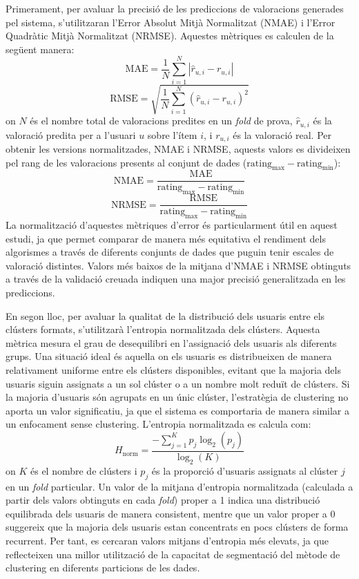 \documentclass[a4paper,12pt]{report}
\begin{document}
Primerament, per avaluar la precisió de les prediccions de valoracions generades pel sistema, s'utilitzaran l'Error Absolut Mitjà Normalitzat (NMAE) i l'Error Quadràtic Mitjà Normalitzat (NRMSE). Aquestes mètriques es calculen de la següent manera:
\[
\text{MAE} = \frac{1}{N} \sum_{i=1}^{N} | \hat{r}_{u,i} - r_{u,i} |
\]
\[
\text{RMSE} = \sqrt{\frac{1}{N} \sum_{i=1}^{N} (\hat{r}_{u,i} - r_{u,i})^2}
\]
on \(N\) és el nombre total de valoracions predites en un \textit{fold} de prova, \( \hat{r}_{u,i} \) és la valoració predita per a l'usuari \(u\) sobre l'ítem \(i\), i \( r_{u,i} \) és la valoració real.
Per obtenir les versions normalitzades, NMAE i NRMSE, aquests valors es divideixen pel rang de les valoracions presents al conjunt de dades (\( \text{rating}_{\text{max}} - \text{rating}_{\text{min}} \)):
\[
\text{NMAE} = \frac{\text{MAE}}{\text{rating}_{\text{max}} - \text{rating}_{\text{min}}}
\]
\[
\text{NRMSE} = \frac{\text{RMSE}}{\text{rating}_{\text{max}} - \text{rating}_{\text{min}}}
\]
La normalització d'aquestes mètriques d'error és particularment útil en aquest estudi, ja que permet comparar de manera més equitativa el rendiment dels algorismes a través de diferents conjunts de dades que puguin tenir escales de valoració distintes. Valors més baixos de la mitjana d'NMAE i NRMSE obtinguts a través de la validació creuada indiquen una major precisió generalitzada en les prediccions.

En segon lloc, per avaluar la qualitat de la distribució dels usuaris entre els clústers formats, s'utilitzarà l'entropia normalitzada dels clústers. Aquesta mètrica mesura el grau de desequilibri en l'assignació dels usuaris als diferents grups. Una situació ideal és aquella on els usuaris es distribueixen de manera relativament uniforme entre els clústers disponibles, evitant que la majoria dels usuaris siguin assignats a un sol clúster o a un nombre molt reduït de clústers. Si la majoria d'usuaris són agrupats en un únic clúster, l'estratègia de clustering no aporta un valor significatiu, ja que el sistema es comportaria de manera similar a un enfocament sense clustering. L'entropia normalitzada es calcula com:
\[
H_{\text{norm}} = \frac{-\sum_{j=1}^{K} p_j \log_2(p_j)}{\log_2(K)}
\]
on \(K\) és el nombre de clústers i \(p_j\) és la proporció d'usuaris assignats al clúster \(j\) en un \textit{fold} particular. Un valor de la mitjana d'entropia normalitzada (calculada a partir dels valors obtinguts en cada \textit{fold}) proper a 1 indica una distribució equilibrada dels usuaris de manera consistent, mentre que un valor proper a 0 suggereix que la majoria dels usuaris estan concentrats en pocs clústers de forma recurrent. Per tant, es cercaran valors mitjans d'entropia més elevats, ja que reflecteixen una millor utilització de la capacitat de segmentació del mètode de clustering en diferents particions de les dades.
\end{document}
